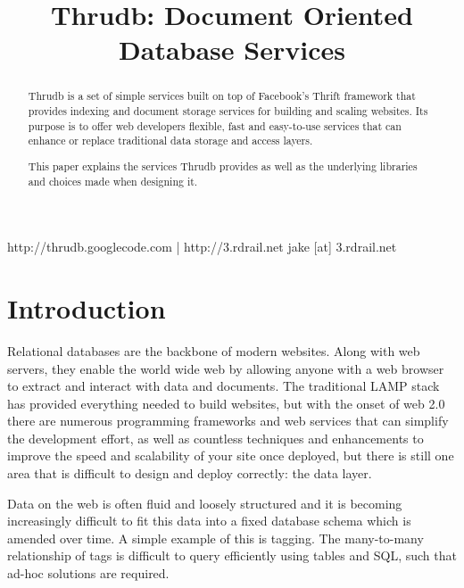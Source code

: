 \documentclass[nocopyrightspace,blockstyle]{sigplanconf}
\begin{document}


\title{Thrudb: Document Oriented Database Services}
\subtitle{}

           {http://thrudb.googlecode.com | http://3.rdrail.net}
           {jake [at] 3.rdrail.net}
\maketitle

\begin{abstract}
Thrudb is a set of simple services built on top of Facebook's Thrift framework that provides
indexing and document storage services for building and scaling websites.
Its purpose is to offer web developers flexible, fast and easy-to-use services that can
enhance or replace traditional data storage and access layers.

This paper explains the services Thrudb provides as well as the underlying libraries and choices
made when designing it.
\end{abstract}




\section{Introduction}
Relational databases are the backbone of modern websites.  Along with web servers, they enable the
world wide web by allowing anyone with a web browser to extract and interact with data and documents.
The traditional LAMP stack has provided everything needed to build websites, but with the onset of web 2.0
there are numerous programming frameworks and web services that can simplify the development effort,
as well as countless techniques and enhancements to improve the speed and scalability of your site once deployed,
but there is still one area that is difficult to design and deploy correctly: the data layer.

Data on the web is often fluid and loosely structured and it is becoming increasingly difficult to fit this data into a fixed database schema which is amended over time.
A simple example of this is tagging. The many-to-many relationship of tags is difficult to query efficiently using tables and SQL, such that ad-hoc solutions are required.
\end{document}
